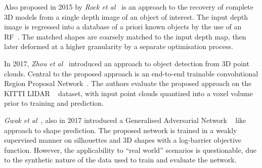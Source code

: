 Also proposed in 2015 by \textit{Rock et al}~\cite{Rock2015} is an approach to the recovery of complete 
3D models from a single depth image of an object of interest. The input depth image is regressed into a 
database of a priori known objects by the use of an RF~\cite{Ho1995}. The matched shapes are 
coarsely matched to the input depth map, then later deformed at a higher granularity by a separate 
optimisation process.

In 2017, \textit{Zhou et al}~\cite{Zhou2017} introduced an approach to object detection from 3D point 
clouds. Central to the proposed approach is an end-to-end trainable convolutional Region Proposal 
Network~\cite{Girshick2015_2}. The authors evaluate the proposed approach on the KITTI LIDAR
~\cite{Geiger2013} dataset, with input point clouds quantized into a voxel volume prior to training 
and prediction.

\textit{Gwak et al}~\cite{Gwak2017}, also in 2017 introduced a Generalised Adversarial Network
~\cite{Goodfellow2014} like approach to shape prediction. The proposed network is trained in a 
weakly supervised manner on silhouettes and 3D shapes with a log-barrier objective function. 
However, the applicability to ``real world'' scenarios is questionable, due to the synthetic nature of 
the data used to train and evaluate the network.

